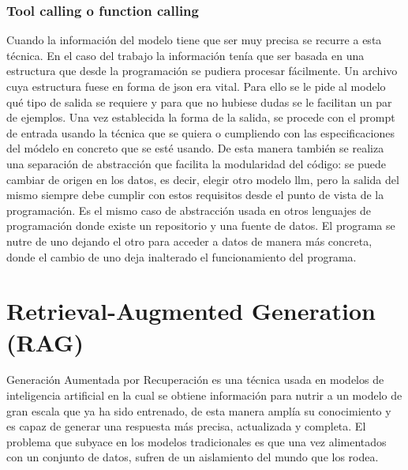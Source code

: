 \subsubsection{Tool calling o function calling}
Cuando la información del modelo tiene que ser muy precisa se recurre a esta técnica. En el caso del trabajo la información tenía que ser basada en una estructura que desde la programación se pudiera procesar fácilmente. Un archivo cuya estructura fuese en forma de json era vital. Para ello se le pide al modelo qué tipo de salida se requiere y para que no hubiese dudas se le facilitan un par de ejemplos. Una vez establecida la forma de la salida, se procede con el prompt de entrada usando la técnica que se quiera o cumpliendo con las especificaciones del módelo en concreto que se esté usando.
De esta manera también se realiza una separación de abstracción que facilita la modularidad del código: se puede cambiar de origen en los datos, es decir, elegir otro modelo \acrshort{llm}, pero la salida del mismo siempre debe cumplir con estos requisitos desde el punto de vista de la programación. Es el mismo caso de abstracción usada en otros lenguajes de programación donde existe un repositorio y una fuente de datos. El programa se nutre de uno dejando el otro para acceder a datos de manera más concreta, donde el cambio de uno deja inalterado el funcionamiento del programa.

\section{Retrieval-Augmented Generation (RAG)}
Generación Aumentada por Recuperación es una técnica usada en modelos de inteligencia artificial en la cual se obtiene información para nutrir a un modelo de gran escala que ya ha sido entrenado, de esta manera amplía su conocimiento y es capaz de generar una respuesta más precisa, actualizada y completa. 
El problema que subyace en los modelos tradicionales es que una vez alimentados con un conjunto de datos, sufren de un aislamiento del mundo que los rodea.

